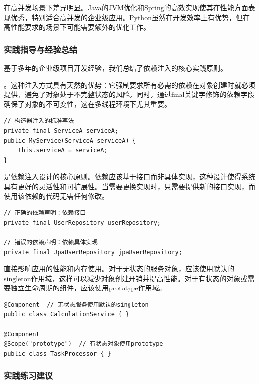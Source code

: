 在高并发场景下差异明显。Java的JVM优化和Spring的高效实现使其在性能方面表现优秀，特别适合高并发的企业级应用。Python虽然在开发效率上有优势，但在高性能要求的场景下可能需要额外的优化工作。

\hypertarget{ux5b9eux8df5ux6307ux5bfcux4e0eux7ecfux9a8cux603bux7ed3}{%
\subsubsection{实践指导与经验总结}\label{ux5b9eux8df5ux6307ux5bfcux4e0eux7ecfux9a8cux603bux7ed3}}

基于多年的企业级项目开发经验，我们总结了依赖注入的核心实践原则。

。这种注入方式具有天然的优势：它强制要求所有必需的依赖在对象创建时就必须提供，避免了对象处于不完整状态的风险。同时，通过final关键字修饰的依赖字段确保了对象的不可变性，这在多线程环境下尤其重要。

\begin{lstlisting}[style=java]
// 构造器注入的标准写法
private final ServiceA serviceA;
public MyService(ServiceA serviceA) {
    this.serviceA = serviceA;
}
\end{lstlisting}

是依赖注入设计的核心原则。依赖应该基于接口而非具体实现，这种设计使得系统具有更好的灵活性和可扩展性。当需要更换实现时，只需要提供新的接口实现，而使用该依赖的代码无需任何修改。

\begin{lstlisting}[style=java]
// 正确的依赖声明：依赖接口
private final UserRepository userRepository;

// 错误的依赖声明：依赖具体实现
private final JpaUserRepository jpaUserRepository;
\end{lstlisting}

直接影响应用的性能和内存使用。对于无状态的服务对象，应该使用默认的singleton作用域，这样可以减少对象创建开销并提高性能。对于有状态的对象或需要独立生命周期的组件，应该使用prototype作用域。

\begin{lstlisting}[style=java]
@Component  // 无状态服务使用默认的singleton
public class CalculationService { }

@Component
@Scope("prototype")  // 有状态对象使用prototype
public class TaskProcessor { }
\end{lstlisting}

\hypertarget{ux5b9eux8df5ux7ec3ux4e60ux5efaux8bae-2}{%
\subsubsection{实践练习建议}\label{ux5b9eux8df5ux7ec3ux4e60ux5efaux8bae-2}}

